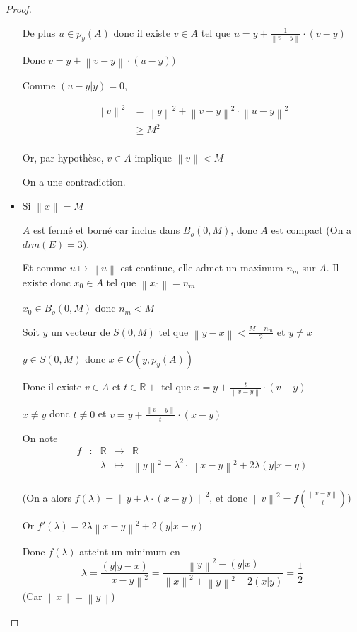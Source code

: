 \documentclass[a4paper]{article}
\newcommand{\norm}[1]{\left\lVert#1\right\rVert}
\begin{document}
\begin{proof}
\begin{itemize}
    De plus $u \in p_{y}(A)$ donc il existe $v \in A$ tel que $u = y + \frac{1}{\norm{v -  y}} \cdot (v - y)$

    Donc $v = y + \norm{v - y} \cdot (u - y))$

    Comme $(u - y|y) = 0$,

    \begin{align*}
    \norm{v}^{2} &= \norm{y}^{2} + \norm{v - y}^{2} \cdot \norm{u - y}^{2} \\
                 &\geqslant M^{2} \\
    \end{align*}


    Or, par hypothèse, $v \in A$ implique $\norm{v} < M$

    On a une contradiction.

    \bigskip

    \item Si  $\norm{x} = M$

    $A$ est fermé et borné car inclus dans $B_{o}(0, M)$, donc $A$ est compact (On a $dim(E) = 3$).

    Et comme $u \mapsto \norm{u}$ est continue, elle admet un maximum $n_{m}$ sur $A$. Il existe donc $x_{0} \in A$ tel que $\norm{x_{0}} = n_{m}$

    $x_{0} \in B_{o}(0, M)$ donc $n_{m} < M$

    Soit $y$ un vecteur de $S(0, M)$ tel que $\norm{y - x} < \frac{M - n_{m}}{2}$ et $y \neq x$

    $y \in S(0, M)$ donc $x \in C(y, p_{y}(A))$

    Donc il existe $v \in A$ et $t \in \mathbb{R}+$ tel que $x = y + \frac{t}{\norm{v - y}} \cdot (v - y)$

    $x \neq y$ donc $t \neq 0$ et $v = y + \frac{\norm{v - y}}{t} \cdot (x - y)$

    On note 
    \[\begin{array}{ccccl}
    f & : & \mathbb{R} & \to & \mathbb{R} \\
     & & \lambda & \mapsto & \norm{y}^{2} + \lambda^{2} \cdot \norm{x - y}^{2} + 2 \lambda (y|x - y)\\
    \end{array}\]

    (On a alors $f(\lambda) = \norm{y + \lambda \cdot (x - y)}^{2}$, et donc $\norm{v}^{2} = f(\frac{\norm{v - y}}{t})$)

    Or $f'(\lambda) = 2 \lambda \norm{x - y}^{2} + 2(y|x - y)$

    Donc $f(\lambda)$ atteint un minimum en
    \[\lambda = \frac{(y|y - x)}{\norm{x - y}^2} = \frac{\norm{y}^{2} - (y|x)}{\norm{x}^{2} + \norm{y}^{2} - 2 (x|y)} = \frac{1}{2}\]
    (Car $\norm{x} = \norm{y}$)


\end{itemize}
\end{proof}
\end{document}
